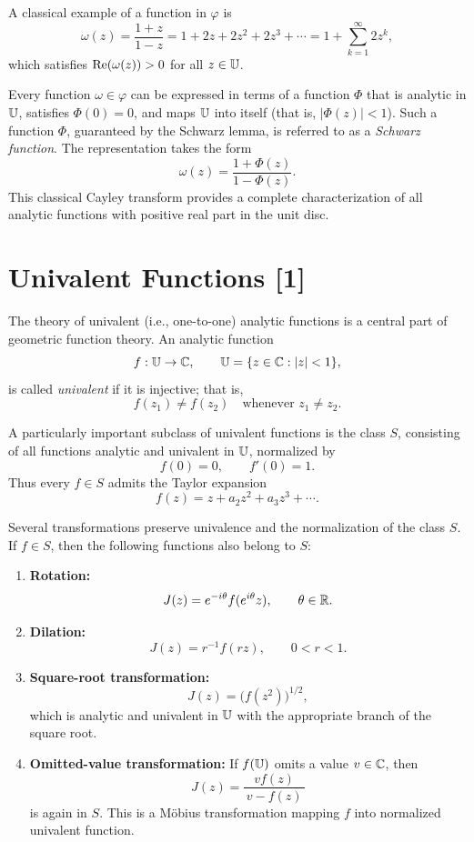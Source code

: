A classical example of a function in \(\varphi\) is
\[
\omega(z) = \frac{1 + z}{1 - z}
= 1 + 2z + 2z^2 + 2z^3 + \cdots
= 1 + \sum_{k=1}^{\infty} 2 z^k,
\]
which satisfies \(\operatorname{Re}(\omega(z)) > 0\) for all \(z \in \mathbb{U}\).

Every function \(\omega \in \varphi\) can be expressed in terms of a function \(\Phi\) that is analytic in \(\mathbb{U}\), satisfies \(\Phi(0) = 0\), and maps \(\mathbb{U}\) into itself (that is, \( |\Phi(z)| < 1 \)).  
Such a function \(\Phi\), guaranteed by the Schwarz lemma, is referred to as a \emph{Schwarz function}.  
The representation takes the form
\begin{equation}\label{eq:cayley-transform}
	\omega(z) = \frac{1 + \Phi(z)}{1 - \Phi(z)}.
\end{equation}
This classical Cayley transform provides a complete characterization of all analytic functions with positive real part in the unit disc.
\newpage

\section[Univalent Functions]{Univalent Functions [1]}

The theory of univalent (i.e., one-to-one) analytic functions is a central part of geometric function theory.  
An analytic function
\[
f : \mathbb{U} \to \mathbb{C}, 
\qquad 
\mathbb{U} = \{ z \in \mathbb{C} : |z| < 1 \},
\]
is called \emph{univalent} if it is injective; that is,
\[
f(z_1) \neq f(z_2) \quad \text{whenever } z_1 \neq z_2.
\]

A particularly important subclass of univalent functions is the class \(S\), consisting of all functions analytic and univalent in \(\mathbb{U}\), normalized by
\[
f(0) = 0, 
\qquad 
f'(0) = 1.
\]
Thus every \(f \in S\) admits the Taylor expansion
\[
f(z) = z + a_2 z^2 + a_3 z^3 + \cdots.
\]

Several transformations preserve univalence and the normalization of the class \(S\).  
If \(f \in S\), then the following functions also belong to \(S\):

\begin{enumerate}
	\item \textbf{Rotation:}
	\[
	J(z) = e^{-i\theta} f(e^{i\theta} z),
	\qquad \theta \in \mathbb{R}.
	\]
	
	\item \textbf{Dilation:}
	\[
	J(z) = r^{-1} f(rz),
	\qquad 
	0 < r < 1.
	\]
	
	\item \textbf{Square-root transformation:}
	\[
	J(z) = \big(f(z^2)\big)^{1/2},
	\]
	which is analytic and univalent in \(\mathbb{U}\) with the appropriate branch of the square root.
	
	\item \textbf{Omitted-value transformation:}  
	If \(f(\mathbb{U})\) omits a value \(v \in \mathbb{C}\), then
	\[
	J(z) = \frac{v f(z)}{\, v - f(z)\, }
	\]
	is again in \(S\).  
	This is a Möbius transformation mapping \(f\) into  normalized univalent function.
\end{enumerate}

